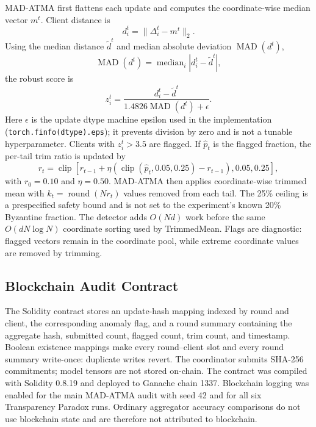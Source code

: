 \documentclass[10pt,letterpaper]{article}
\begin{document}
MAD-ATMA first flattens each update and computes the coordinate-wise median
vector $m^t$. Client distance is
\begin{equation}
d_i^t=\|\Delta_i^t-m^t\|_2.
\end{equation}
Using the median distance $\widetilde d^t$ and median absolute deviation
$\operatorname{MAD}(d^t)$,
\begin{equation}
\operatorname{MAD}(d^t)=
\operatorname{median}_{i}\left|d_i^t-\widetilde d^t\right|,
\end{equation}
the robust score is
\begin{equation}
z_i^t =
\frac{d_i^t-\widetilde d^t}
{1.4826\operatorname{MAD}(d^t)+\epsilon}.
\end{equation}
Here $\epsilon$ is the update dtype machine epsilon used in the implementation
(\texttt{torch.finfo(dtype).eps}); it prevents division by zero and is not a
tunable hyperparameter. Clients with $z_i^t>3.5$ are flagged. If
$\widehat p_t$ is the flagged fraction, the per-tail trim ratio is updated by
\begin{equation}
r_t=\operatorname{clip}\left[
r_{t-1}+\eta\left(
\operatorname{clip}(\widehat p_t,0.05,0.25)-r_{t-1}
\right),0.05,0.25\right],
\end{equation}
with $r_0=0.10$ and $\eta=0.50$. MAD-ATMA then applies coordinate-wise trimmed
mean with $k_t=\operatorname{round}(Nr_t)$ values removed from each tail. The
25\% ceiling is a prespecified safety bound and is not set to the experiment's
known 20\% Byzantine fraction. The detector adds $O(Nd)$ work before the same
$O(dN\log N)$ coordinate sorting used by TrimmedMean. Flags are diagnostic:
flagged vectors remain in the coordinate pool, while extreme coordinate values
are removed by trimming.

\subsection{Blockchain Audit Contract}

The Solidity contract stores an update-hash mapping indexed by round and
client, the corresponding anomaly flag, and a round summary containing the
aggregate hash, submitted count, flagged count, trim count, and timestamp.
Boolean existence mappings make every round--client slot and every round
summary write-once: duplicate writes revert. The coordinator submits SHA-256
commitments; model tensors are not stored on-chain. The contract was compiled
with Solidity 0.8.19 and deployed to Ganache chain 1337. Blockchain logging was
enabled for the main MAD-ATMA audit with seed 42 and for all six Transparency
Paradox runs. Ordinary aggregator accuracy comparisons do not use blockchain
state and are therefore not attributed to blockchain.
\end{document}
